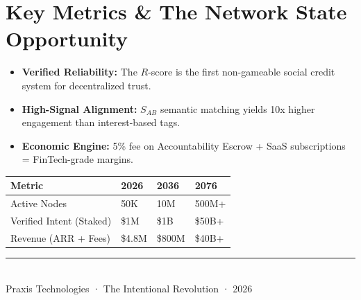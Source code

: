 \documentclass[11pt,a4paper]{article}
\begin{document}
\section*{Key Metrics \& The Network State Opportunity}
\begin{itemize}
    \item \textbf{Verified Reliability:} The $R$-score is the first non-gameable social credit system for decentralized trust.
    \item \textbf{High-Signal Alignment:} $S_{AB}$ semantic matching yields 10x higher engagement than interest-based tags.
    \item \textbf{Economic Engine:} 5\% fee on Accountability Escrow + SaaS subscriptions = FinTech-grade margins.
\end{itemize}

\begin{center}
\begin{tabularx}{\linewidth}{l X X X}
\toprule
\textbf{Metric} & \textbf{2026} & \textbf{2036} & \textbf{2076} \\
\midrule
Active Nodes & 50K & 10M & 500M+ \\
Verified Intent (Staked) & \$1M & \$1B & \$50B+ \\
Revenue (ARR + Fees) & \$4.8M & \$800M & \$40B+ \\
\bottomrule
\end{tabularx}
\end{center}

\vfill
\begin{center}
\textcolor{praxisBlue}{\rule{8cm}{1.5pt}} \\
\small\textcolor{praxisPurple}{Praxis Technologies · The Intentional Revolution · 2026}
\end{center}
\end{document}
